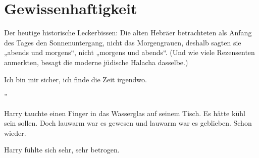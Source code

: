 \chapter{Gewissenhaftigkeit}

\begin{chapterOpeningAuthorNote}
% 
Der heutige historische Leckerbissen: Die alten Hebräer betrachteten als Anfang des Tages den Sonnenuntergang, nicht das Morgengrauen, deshalb sagten sie „abends und morgens“, nicht „morgens und abends“. (Und wie viele Rezensenten anmerkten, besagt die moderne jüdische Halacha dasselbe.)
\end{chapterOpeningAuthorNote}
\begin{chapterOpeningQuote}
Ich bin mir sicher, ich finde die Zeit irgendwo.
\end{chapterOpeningQuote}

”

\hplettrineextrapara
Harry tauchte einen Finger in das Wasserglas auf seinem Tisch. Es hätte kühl sein sollen. Doch lauwarm war es gewesen und lauwarm war es geblieben. Schon wieder.

Harry fühlte sich sehr, sehr betrogen.

